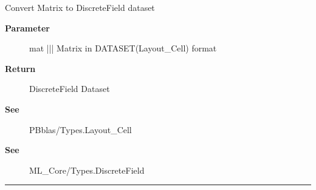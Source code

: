\par
Convert Matrix to DiscreteField dataset

\par
\begin{description}
\item [\textbf{Parameter}] mat ||| Matrix in DATASET(Layout\_Cell) format
\item [\textbf{Return}] DiscreteField Dataset
\item [\textbf{See}] PBblas/Types.Layout\_Cell
\item [\textbf{See}] ML\_Core/Types.DiscreteField
\end{description}

\rule{\linewidth}{0.5pt}


